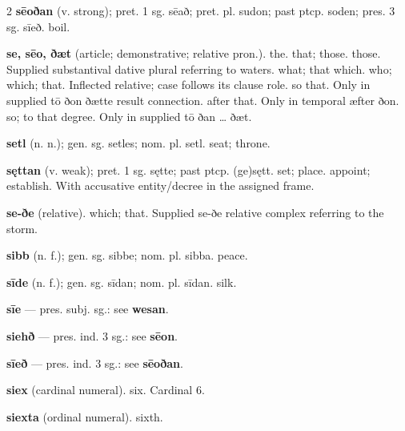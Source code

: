 \begin{multicols*}{2}
\textbf{sēoðan} (v. strong); pret. 1 sg. sēað; pret. pl. sudon; past ptcp. soden; pres. 3 sg. sīeð. boil.\par
\textbf{se, sēo, ðæt} (article; demonstrative; relative pron.). the. that; those. those. Supplied substantival dative plural referring to waters. what; that which. who; which; that. Inflected relative; case follows its clause role. so that. Only in supplied tō ðon ðætte result connection. after that. Only in temporal æfter ðon. so; to that degree. Only in supplied tō ðan … ðæt.\par
\textbf{setl} (n. n.); gen. sg. setles; nom. pl. setl. seat; throne.\par
\textbf{sęttan} (v. weak); pret. 1 sg. sętte; past ptcp. (ge)sętt. set; place. appoint; establish. With accusative entity/decree in the assigned frame.\par
\textbf{se-ðe} (relative). which; that. Supplied se-ðe relative complex referring to the storm.\par
\textbf{sibb} (n. f.); gen. sg. sibbe; nom. pl. sibba. peace.\par
\textbf{sīde} (n. f.); gen. sg. sīdan; nom. pl. sīdan. silk.\par
\textbf{sīe} — pres. subj. sg.: see \textbf{wesan}.\par
\textbf{siehð} — pres. ind. 3 sg.: see \textbf{sēon}.\par
\textbf{sīeð} — pres. ind. 3 sg.: see \textbf{sēoðan}.\par
\textbf{siex} (cardinal numeral). six. Cardinal 6.\par
\textbf{siexta} (ordinal numeral). sixth.\par

\end{multicols*}
